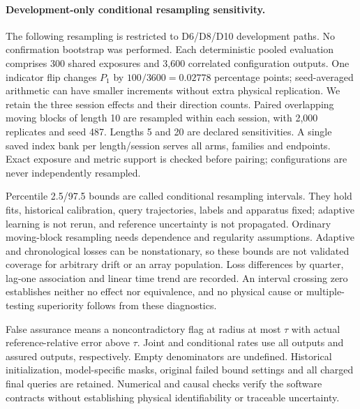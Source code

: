 \paragraph{Development-only conditional resampling sensitivity.}
The following resampling is restricted to D6/D8/D10 development paths. No confirmation bootstrap was performed.
Each deterministic pooled evaluation comprises 300 shared exposures and 3,600 correlated configuration outputs. One indicator flip changes $P_1$ by $100/3600=0.02778$ percentage points; seed-averaged arithmetic can have smaller increments without extra physical replication. We retain the three session effects and their direction counts. Paired overlapping moving blocks of length 10 are resampled within each session, with 2,000 replicates and seed 487. Lengths 5 and 20 are declared sensitivities. A single saved index bank per length/session serves all arms, families and endpoints. Exact exposure and metric support is checked before pairing; configurations are never independently resampled.

Percentile 2.5/97.5 bounds are called conditional resampling intervals. They hold fits, historical calibration, query trajectories, labels and apparatus fixed; adaptive learning is not rerun, and reference uncertainty is not propagated. Ordinary moving-block resampling needs dependence and regularity assumptions. Adaptive and chronological losses can be nonstationary, so these bounds are not validated coverage for arbitrary drift or an array population. Loss differences by quarter, lag-one association and linear time trend are recorded. An interval crossing zero establishes neither no effect nor equivalence, and no physical cause or multiple-testing superiority follows from these diagnostics.

False assurance means a noncontradictory flag at radius at most $\tau$ with actual reference-relative error above $\tau$. Joint and conditional rates use all outputs and assured outputs, respectively. Empty denominators are undefined. Historical initialization, model-specific masks, original failed bound settings and all charged final queries are retained. Numerical and causal checks verify the software contracts without establishing physical identifiability or traceable uncertainty.
